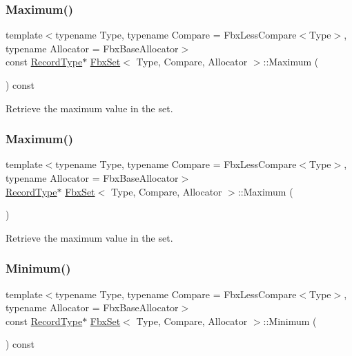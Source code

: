 \subsubsection{\texorpdfstring{Maximum()}{Maximum()}\hspace{0.1cm}{\footnotesize\ttfamily [1/2]}}
{\footnotesize\ttfamily template$<$typename Type, typename Compare = Fbx\+Less\+Compare$<$\+Type$>$, typename Allocator = Fbx\+Base\+Allocator$>$ \\
const \hyperlink{class_fbx_set_aa3934cd434a09288204f5e6c99b9cd01}{Record\+Type}$\ast$ \hyperlink{class_fbx_set}{Fbx\+Set}$<$ Type, Compare, Allocator $>$\+::Maximum (\begin{DoxyParamCaption}{ }\end{DoxyParamCaption}) const}



Retrieve the maximum value in the set. 

\mbox{\label{class_fbx_set_a81b244938a3b473b59d146336737f8ed}} 
\subsubsection{\texorpdfstring{Maximum()}{Maximum()}\hspace{0.1cm}{\footnotesize\ttfamily [2/2]}}
{\footnotesize\ttfamily template$<$typename Type, typename Compare = Fbx\+Less\+Compare$<$\+Type$>$, typename Allocator = Fbx\+Base\+Allocator$>$ \\
\hyperlink{class_fbx_set_aa3934cd434a09288204f5e6c99b9cd01}{Record\+Type}$\ast$ \hyperlink{class_fbx_set}{Fbx\+Set}$<$ Type, Compare, Allocator $>$\+::Maximum (\begin{DoxyParamCaption}{ }\end{DoxyParamCaption})}



Retrieve the maximum value in the set. 

\mbox{\label{class_fbx_set_a11cee93b66335569aa45fbcd886ae9ff}} 
\subsubsection{\texorpdfstring{Minimum()}{Minimum()}\hspace{0.1cm}{\footnotesize\ttfamily [1/2]}}
{\footnotesize\ttfamily template$<$typename Type, typename Compare = Fbx\+Less\+Compare$<$\+Type$>$, typename Allocator = Fbx\+Base\+Allocator$>$ \\
const \hyperlink{class_fbx_set_aa3934cd434a09288204f5e6c99b9cd01}{Record\+Type}$\ast$ \hyperlink{class_fbx_set}{Fbx\+Set}$<$ Type, Compare, Allocator $>$\+::Minimum (\begin{DoxyParamCaption}{ }\end{DoxyParamCaption}) const}



